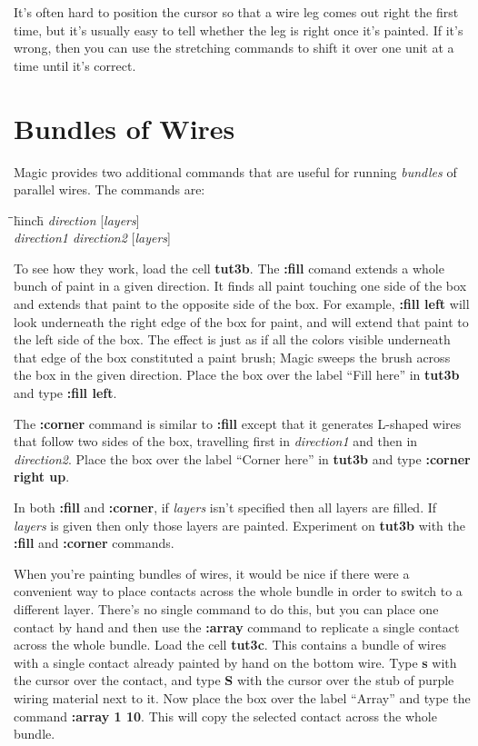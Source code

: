 \documentclass[letterpaper,twoside,12pt]{article}
\def\hinch{\hspace*{0.5in}}
\def\starti{\begin{center}\begin{tabbing}\hinch\=\hinch\=\hinch\=hinch\hinch\=\kill}
\def\endi{\end{tabbing}\end{center}}
\def\ii{\>\>\>}
\begin{document}
It's often hard to position the cursor
so that a wire leg comes out right the first time, but it's usually
easy to tell whether the leg is right once it's painted.  If it's
wrong, then you can use the stretching commands to shift it over
one unit at a time until it's correct.

\section{Bundles of Wires}

Magic provides two additional commands that are useful for
running {\itshape bundles} of parallel wires.  The commands are:

\starti
   \ii {\bfseries fill} {\itshape direction }[{\itshape layers}] \\
   \ii {\bfseries corner} {\itshape direction1 direction2 }[{\itshape layers}]
\endi

To see how they work, load the cell {\bfseries tut3b}.  The
{\bfseries :fill} comand extends a whole bunch of paint in a given direction.
It finds all paint touching
one side of the box and extends that paint to the opposite
side of the box.  For example, {\bfseries :fill left} will look underneath
the right edge of the box for paint, and will extend that paint
to the left side of the box.  The effect is just as if all the colors
visible underneath that edge of the box constituted a paint brush;
Magic sweeps the brush across the box in the given direction.
Place the box over the label ``Fill here'' in {\bfseries tut3b} and
type {\bfseries :fill left}.

The {\bfseries :corner} command is similar to {\bfseries :fill} except that
it generates L-shaped wires that follow two sides of the box,
travelling first in {\itshape direction1} and then in {\itshape direction2}.
Place the box over the label ``Corner here'' in {\bfseries tut3b} and
type {\bfseries :corner right up}.

In both {\bfseries :fill} and {\bfseries :corner},
if {\itshape layers} isn't specified then all layers are filled.
If {\itshape layers} is given then only those layers are painted.
Experiment on {\bfseries tut3b} with the {\bfseries :fill} and {\bfseries :corner}
commands.

When you're painting bundles of wires, it would be nice if there
were a convenient way to place contacts across the whole bundle
in order to switch to a different layer.  There's no single
command to do this, but you can place one contact by hand and
then use the {\bfseries :array} command to
replicate a single contact across the whole bundle.
Load the cell {\bfseries tut3c}.  This contains a bundle of wires
with a single contact already painted by hand on the bottom
wire.  Type {\bfseries s} with the cursor over the contact, and
type {\bfseries S} with the cursor over the stub of purple wiring
material next to it.
Now place the box over the label ``Array'' and type the command
{\bfseries :array 1 10}.  This will copy the selected contact across
the whole bundle.
\end{document}

